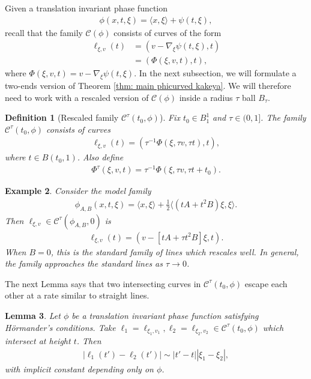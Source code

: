 \documentclass[12pt]{amsart}
\numberwithin{equation}{section}
\newtheorem{lemma}{Lemma}[section]
\newtheorem{example}[lemma]{Example}
\newtheorem{definition}[lemma]{Definition}
\newcommand{\1}{\mathbbm{1}}
\begin{document}
Given a translation invariant phase function 
\begin{align}
    \phi(x,t,\xi) = \langle x, \xi \rangle + \psi(t,\xi),
\end{align}
recall that the family $\mathcal C(\phi)$ consists of curves of the form 
\begin{align}
    \ell_{\xi, v}(t) &= (v - \nabla_\xi \psi(t,\xi), t) \\
    &= (\Phi(\xi, v, t), t),
\end{align}
where $\Phi(\xi, v, t) = v - \nabla_\xi \psi(t,\xi)$. 
In the next subsection, we will formulate a two-ends version of Theorem \ref{thm: main phicurved kakeya}. We will therefore need to work with a rescaled version of $\mathcal C(\phi)$ inside a radius $\tau$ ball $B_{\tau}$.  
\begin{definition}[Rescaled family $\mathcal C^{\tau}(t_0, \phi)$]
    Fix $t_0 \in B_1^1$ and $\tau \in (0,1]$. The family $\mathcal C^{\tau}(t_0, \phi)$ consists of curves 
    \begin{align}
        \ell_{\xi, v}(t) = (\tau^{-1} \Phi(\xi, \tau v, \tau t), t), 
    \end{align}
    where $t \in B(t_0,1)$. Also define 
    \begin{align}
        \Phi^\tau(\xi, v, t) = \tau^{-1} \Phi(\xi, \tau v, \tau t + t_0).
    \end{align}
\end{definition}

\begin{example}
    Consider the model family 
    \begin{align}
        \phi_{A,B}(x,t,\xi) = \langle x, \xi \rangle + \frac{1}{2} \langle (tA + t^2 B) \xi, \xi \rangle. 
    \end{align}
    Then $\ell_{\xi, v} \in \mathcal C^\tau (\phi_{A,B}, 0)$ is 
    \begin{align}
        \ell_{\xi, v}(t) = (v - [tA + \tau t^2 B]\xi, t). 
    \end{align}
    When $B = 0$, this is the standard family of lines which rescales well. In general, the family approaches the standard lines as $\tau \to 0$. 
\end{example} 

The next Lemma says that two intersecting curves in $\mathcal C^{\tau}(t_0, \phi)$ escape each other at a rate similar to straight lines. 
\begin{lemma}\label{lem: curve escape rate}
    Let $\phi$ be a translation invariant phase function satisfying H\"ormander's conditions. Take $\ell_1 = \ell_{\xi_1,v_1}, \ell_2 = \ell_{\xi_2, v_2} \in \mathcal C^\tau(t_0, \phi)$ which intersect at height $t$. Then 
    \begin{align}
        |\ell_1(t') - \ell_2(t')| \sim |t' - t| |\xi_1 - \xi_2|,
    \end{align}
    with implicit constant depending only on $\phi$. 
\end{lemma}
\end{document}
